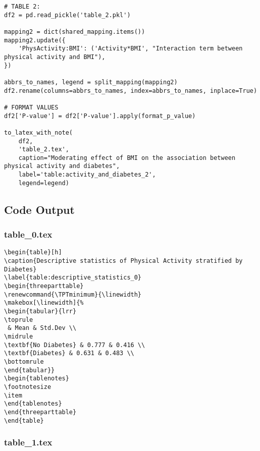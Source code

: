 \documentclass[11pt]{article}
\begin{document}
\begin{verbatim}
# TABLE 2:
df2 = pd.read_pickle('table_2.pkl')

mapping2 = dict(shared_mapping.items())
mapping2.update({
    'PhysActivity:BMI': ('Activity*BMI', "Interaction term between physical activity and BMI"),
})

abbrs_to_names, legend = split_mapping(mapping2)
df2.rename(columns=abbrs_to_names, index=abbrs_to_names, inplace=True)

# FORMAT VALUES
df2['P-value'] = df2['P-value'].apply(format_p_value)

to_latex_with_note(
    df2, 
    'table_2.tex',
    caption="Moderating effect of BMI on the association between physical activity and diabetes",
    label='table:activity_and_diabetes_2',
    legend=legend)

\end{verbatim}



\subsection{Code Output}

\subsubsection*{table\_0.tex}

\begin{Verbatim}[tabsize=4]
\begin{table}[h]
\caption{Descriptive statistics of Physical Activity stratified by Diabetes}
\label{table:descriptive_statistics_0}
\begin{threeparttable}
\renewcommand{\TPTminimum}{\linewidth}
\makebox[\linewidth]{%
\begin{tabular}{lrr}
\toprule
 & Mean & Std.Dev \\
\midrule
\textbf{No Diabetes} & 0.777 & 0.416 \\
\textbf{Diabetes} & 0.631 & 0.483 \\
\bottomrule
\end{tabular}}
\begin{tablenotes}
\footnotesize
\item
\end{tablenotes}
\end{threeparttable}
\end{table}

\end{Verbatim}

\subsubsection*{table\_1.tex}
\end{document}
